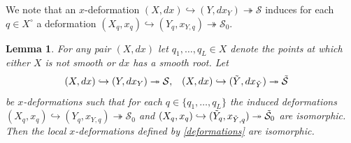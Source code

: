 \documentclass[11pt,twoside]{amsart}
\theoremstyle{plain}
\newtheorem{Lemma}[theorem]{Lemma}
\newcommand{\Sm}{\mathcal{S}}
\newcommand{\Sh}[1]{\mathcal{#1}} %
\newcommand{\dfx}{dx}
\begin{document}
We note that an $x$-deformation $(X,dx)\hookrightarrow(Y,dx_Y)\twoheadrightarrow\Sm$ induces for each $q\in X ^  \circ $ a deformation $(X_q, x_q)\hookrightarrow (Y_q,x_{Y,q})\twoheadrightarrow\Sm_0$. 


\begin{Lemma}\label {lemma:uniqueness}
For any pair $(X,\dfx)$ let $q_1,\ldots,q_L\in X$ denote the points at which either $X$ is not smooth or $\dfx$ has a smooth root. Let 
\begin{align}\label{deformations}
(X,\dfx)\hookrightarrow(Y,\dfx_Y)&\twoheadrightarrow\Sm,&
(X,\dfx)\hookrightarrow(\Tilde{Y},\dfx_{\Tilde{Y}})&\twoheadrightarrow\Tilde{\Sm}
\end{align}
be $x$-deformations such that for each $q\in\{q_1,\ldots,q_L\}$ the induced deformations $(X_q,x_q)\hookrightarrow(Y_q,x_{Y,q})\twoheadrightarrow\Sm_0$ and $(X_q,x_q)\hookrightarrow(\Tilde{Y}_q,x_{\Tilde{Y},q})\twoheadrightarrow\Tilde{\Sm}_0$ are isomorphic. %
Then the local $x$-deformations defined by \eqref{deformations} are isomorphic.
\end{Lemma}
\end{document}
